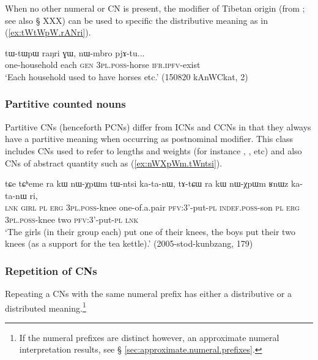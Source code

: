 When no other numeral or CN is present, the modifier of Tibetan origin  (from ; see also § XXX) can be used to specific the distributive meaning as in (\ref{ex:tWtWpW.rANri}).

\begin{exe}
\ex \label{ex:tWtWpW.rANri}
\gll tɯ-tɯpɯ raŋri ɣɯ, nɯ-mbro pjɤ-tu... \\
one-household  each \textsc{gen} \textsc{3pl}.\textsc{poss}-horse \textsc{ifr}.\textsc{ipfv}-exist \\
\glt `Each household used to have horses etc.' (150820 kAnWCkat, 2)
\end{exe} 

\subsubsection{Partitive counted nouns} \label{sec:CN.partitive}
Partitive CNs (henceforth PCNs) differ from ICNs and CCNs in that they always have a partitive meaning when occurring as postnominal modifier. This class includes CNs used to refer to lengths and weights (for instance , ,  etc) and also CNs of abstract quantity such as  (\ref{ex:nWXpWm.tWntsi}).

\begin{exe}
\ex \label{ex:nWXpWm.tWntsi}
 \gll tɕe tɕʰeme ra kɯ nɯ-χpɯm tɯ-ntsi ka-ta-nɯ, tɤ-tɕɯ ra kɯ nɯ-χpɯm ʁnɯz ka-ta-nɯ ri,  \\
 \textsc{lnk} \textsc{girl} \textsc{pl} \textsc{erg} \textsc{3pl}.\textsc{poss}-knee one-of.a.pair \textsc{pfv}:3'-put-\textsc{pl} \textsc{indef}.\textsc{poss}-son \textsc{pl} \textsc{erg}  \textsc{3pl}.\textsc{poss}-knee two \textsc{pfv}:3'-put-\textsc{pl} \textsc{lnk} \\
 \glt `The girls (in their group each) put one of their knees, the boys put their two knees (as a support for the tea kettle).' (2005-stod-kunbzang, 179)
\end{exe}

\subsubsection{Repetition of CNs} \label{sec:CN.repetition}
Repeating a CNs with the same numeral prefix has either a distributive or a distributed meaning.\footnote{If the numeral prefixes are distinct however, an approximate numeral interpretation results, see § \ref{sec:approximate.numeral.prefixes}.}

